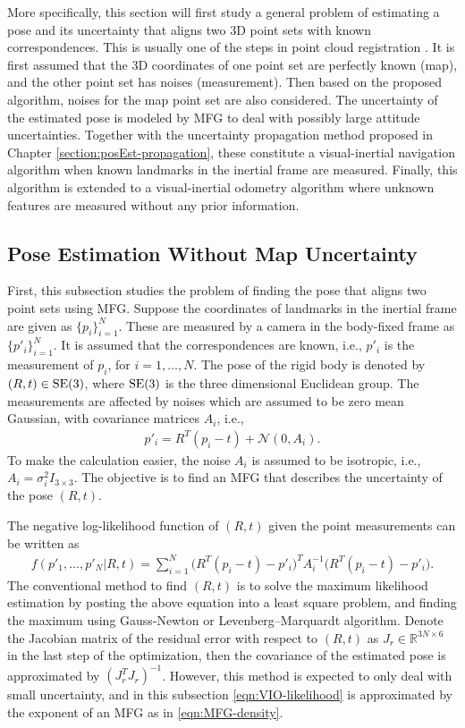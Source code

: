 More specifically, this section will first study a general problem of estimating a pose and its uncertainty that aligns two 3D point sets with known correspondences.
This is usually one of the steps in point cloud registration \cite{huang2021comprehensive}.
It is first assumed that the 3D coordinates of one point set are perfectly known (map), and the other point set has noises (measurement).
Then based on the proposed algorithm, noises for the map point set are also considered.
The uncertainty of the estimated pose is modeled by MFG to deal with possibly large attitude uncertainties.
Together with the uncertainty propagation method proposed in Chapter \ref{section:posEst-propagation}, these constitute a visual-inertial navigation algorithm when known landmarks in the inertial frame are measured.
Finally, this algorithm is extended to a visual-inertial odometry algorithm where unknown features are measured without any prior information.

\subsection{Pose Estimation Without Map Uncertainty} \label{section:VIO-pose}

First, this subsection studies the problem of finding the pose that aligns two point sets using MFG.
Suppose the coordinates of landmarks in the inertial frame are given as $\{p_i\}_{i=1}^N$.
These are measured by a camera in the body-fixed frame as $\{p'_i\}_{i=1}^N$.
It is assumed that the correspondences are known, i.e., $p'_i$ is the measurement of $p_i$, for $i = 1,\ldots,N$.
The pose of the rigid body is denoted by $(R,t)\in\mathrm{SE}(3)$, where $\mathrm{SE}(3)$ is the three dimensional Euclidean group.
The measurements are affected by noises which are assumed to be zero mean Gaussian, with covariance matrices $A_i$, i.e.,
\begin{align}
	p'_i = R^T(p_i-t) + \mathcal{N}(0,A_i).
\end{align}
To make the calculation easier, the noise $A_i$ is assumed to be isotropic, i.e., $A_i = \sigma_i^2I_{3\times 3}$.
The objective is to find an MFG that describes the uncertainty of the pose $(R,t)$.

The negative log-likelihood function of $(R,t)$ given the point measurements can be written as
\begin{align} \label{eqn:VIO-likelihood}
	f(p'_1,\ldots,p'_N | R,t) = \sum_{i=1}^N \big(R^T(p_i-t)-p'_i\big)^T A_i^{-1} \big(R^T(p_i-t)-p'_i\big).
\end{align}
The conventional method to find $(R,t)$ is to solve the maximum likelihood estimation by posting the above equation into a least square problem, and finding the maximum using Gauss-Newton or Levenberg–Marquardt algorithm.
Denote the Jacobian matrix of the residual error with respect to $(R,t)$ as $J_r\in\mathbb{R}^{3N\times 6}$ in the last step of the optimization, then the covariance of the estimated pose is approximated by $(J_r^TJ_r)^{-1}$.
However, this method is expected to only deal with small uncertainty, and in this subsection \eqref{eqn:VIO-likelihood} is approximated by the exponent of an MFG as in \eqref{eqn:MFG-density}.


